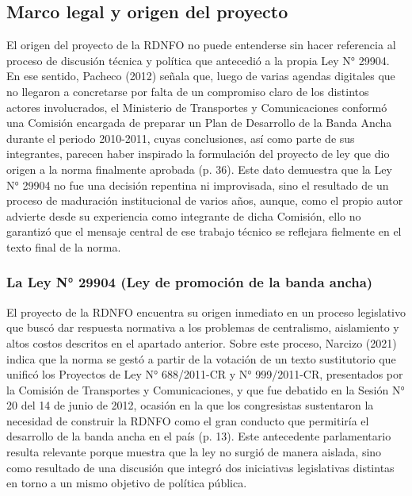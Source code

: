 \subsection{Marco legal y origen del proyecto}
El origen del proyecto de la RDNFO no puede entenderse sin hacer referencia al proceso de discusión técnica y política que antecedió a la propia Ley N° 29904. En ese sentido, Pacheco (2012) señala que, luego de varias agendas digitales que no llegaron a concretarse por falta de un compromiso claro de los distintos actores involucrados, el Ministerio de Transportes y Comunicaciones conformó una Comisión encargada de preparar un Plan de Desarrollo de la Banda Ancha durante el periodo 2010-2011, cuyas conclusiones, así como parte de sus integrantes, parecen haber inspirado la formulación del proyecto de ley que dio origen a la norma finalmente aprobada (p. 36). Este dato demuestra que la Ley N° 29904 no fue una decisión repentina ni improvisada, sino el resultado de un proceso de maduración institucional de varios años, aunque, como el propio autor advierte desde su experiencia como integrante de dicha Comisión, ello no garantizó que el mensaje central de ese trabajo técnico se reflejara fielmente en el texto final de la norma.
\subsubsection{La Ley N° 29904 (Ley de promoción de la banda ancha)}
El proyecto de la RDNFO encuentra su origen inmediato en un proceso legislativo que buscó dar respuesta normativa a los problemas de centralismo, aislamiento y altos costos descritos en el apartado anterior. Sobre este proceso, Narcizo (2021) indica que la norma se gestó a partir de la votación de un texto sustitutorio que unificó los Proyectos de Ley N° 688/2011-CR y N° 999/2011-CR, presentados por la Comisión de Transportes y Comunicaciones, y que fue debatido en la Sesión N° 20 del 14 de junio de 2012, ocasión en la que los congresistas sustentaron la necesidad de construir la RDNFO como el gran conducto que permitiría el desarrollo de la banda ancha en el país (p. 13). Este antecedente parlamentario resulta relevante porque muestra que la ley no surgió de manera aislada, sino como resultado de una discusión que integró dos iniciativas legislativas distintas en torno a un mismo objetivo de política pública.

